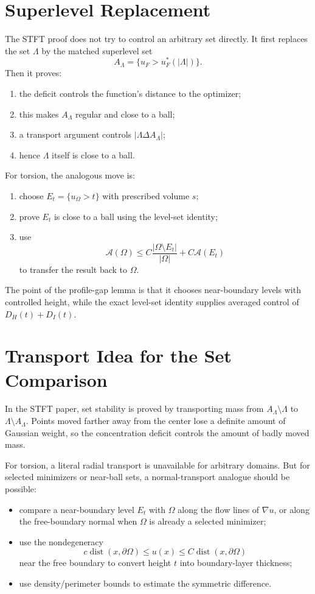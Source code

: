 \documentclass[11pt]{article}
\begin{document}
\section{Superlevel Replacement}

The STFT proof does not try to control an arbitrary set directly. It first
replaces the set \(\Lambda\) by the matched superlevel set
\[
A_\Lambda=\{u_F>u_F^*(|\Lambda|)\}.
\]
Then it proves:
\begin{enumerate}
\item the deficit controls the function's distance to the optimizer;
\item this makes \(A_\Lambda\) regular and close to a ball;
\item a transport argument controls \(|\Lambda\Delta A_\Lambda|\);
\item hence \(\Lambda\) itself is close to a ball.
\end{enumerate}

For torsion, the analogous move is:
\begin{enumerate}
\item choose \(E_t=\{u_\Omega>t\}\) with prescribed volume \(s\);
\item prove \(E_t\) is close to a ball using the level-set identity;
\item use
\[
\mathcal A(\Omega)
\le
C\frac{|\Omega\setminus E_t|}{|\Omega|}
+C\mathcal A(E_t)
\]
to transfer the result back to \(\Omega\).
\end{enumerate}
The point of the profile-gap lemma is that it chooses near-boundary levels with
controlled height, while the exact level-set identity supplies averaged control
of \(D_H(t)+D_I(t)\).

\section{Transport Idea for the Set Comparison}

In the STFT paper, set stability is proved by transporting mass from
\(A_\Lambda\setminus\Lambda\) to \(\Lambda\setminus A_\Lambda\). Points moved
farther away from the center lose a definite amount of Gaussian weight, so the
concentration deficit controls the amount of badly moved mass.

For torsion, a literal radial transport is unavailable for arbitrary domains.
But for selected minimizers or near-ball sets, a normal-transport analogue should
be possible:
\begin{itemize}
\item compare a near-boundary level \(E_t\) with \(\Omega\) along the flow lines
of \(\nabla u\), or along the free-boundary normal when \(\Omega\) is already a
selected minimizer;
\item use the nondegeneracy
\[
c\operatorname{dist}(x,\partial\Omega)
\le u(x)\le
C\operatorname{dist}(x,\partial\Omega)
\]
near the free boundary to convert height \(t\) into boundary-layer thickness;
\item use density/perimeter bounds to estimate the symmetric difference.
\end{itemize}
\end{document}
